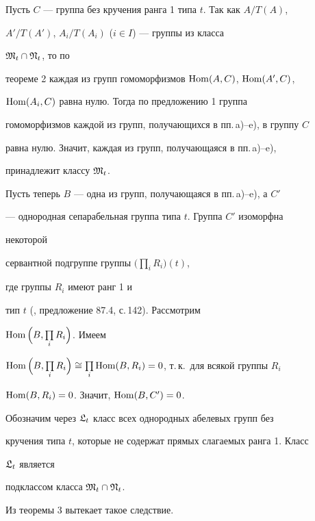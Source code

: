  


\begin{pf} 


Пусть $C$ --- группа без кручения ранга 1 типа $t$. Так как $A/T(A)$, 


$A'/T(A')$, $A_i/T(A_i)$ ($i\in I$) --- группы из класса 


$\frak M_t\cap\frak N_t$, то по 


теореме 2 каждая из групп гомоморфизмов $\operatorname{Hom}(A,C)$, $\operatorname{Hom}(A',C)$, 


$\operatorname{Hom}(A_i,C)$ равна нулю. Тогда по предложению 1 группа 


гомоморфизмов каждой из групп, получающихся в пп.\,a)--e), в группу $C$ 


равна нулю. Значит, каждая из групп, получающаяся в пп.\,a)--e), 


принадлежит классу $\frak M_t$. 


 


Пусть теперь $B$ --- одна из групп, получающаяся в пп.\,a)--e), а $C'$ 


--- однородная сепарабельная группа типа $t$. Группа $C'$ изоморфна 


некоторой 


сервантной подгруппе группы $\Big(\prod\limits_i R_i\Big)(t)$, 


где группы $R_i$ имеют ранг 1 и 


тип $t$ (\cite{4}, предложение 87.4, с.\,142). Рассмотрим 


$\operatorname{Hom}\Big(B,\prod\limits_i R_i\Big)$. Имеем 


$\Hom\Big(B,\prod\limits_i R_i\Big)\cong 


\prod\limits_i\Hom(B,R_i)=0$, т.\,к.~для всякой группы $R_i$\; 


$\operatorname{Hom}(B,R_i)=0$. Значит, $\operatorname{Hom}(B,C')=0$. 


\end{pf} 


 


Обозначим через $\frak L_t$ класс всех однородных абелевых групп без 


кручения типа $t$, которые не содержат прямых слагаемых ранга 1. Класс 


$\frak L_t$ является 


подклассом класса $\frak M_t\cap\frak N_t$. 


 


Из теоремы 3 вытекает такое следствие. 


